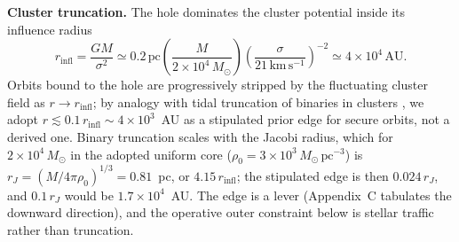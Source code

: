 \documentclass[11pt]{article}
\newcommand{\msun}{\ensuremath{M_\odot}}
\begin{document}
\textbf{Cluster truncation.} The hole dominates the cluster potential inside its influence radius
\begin{equation}
r_{\mathrm{infl}} = \frac{GM}{\sigma^{2}}
\simeq 0.2\,\mathrm{pc}
\left(\frac{M}{2\times10^{4}\,\msun}\right)
\left(\frac{\sigma}{21\,\mathrm{km\,s^{-1}}}\right)^{-2}
\simeq 4\times10^{4}\,\mathrm{AU}.
\end{equation}
Orbits bound to the hole are progressively stripped by the fluctuating cluster field as $r \to r_{\mathrm{infl}}$; by analogy with tidal truncation of binaries in clusters \citep{BinneyTremaine2008,HeggieHut2003}, we adopt $r \lesssim 0.1\,r_{\mathrm{infl}} \sim 4\times10^{3}$~AU as a stipulated prior edge for secure orbits, not a derived one. Binary truncation scales with the Jacobi radius, which for $2\times10^{4}\,\msun$ in the adopted uniform core ($\rho_{0} = 3\times10^{3}\,\msun\,\mathrm{pc^{-3}}$) is $r_{J} = (M/4\pi\rho_{0})^{1/3} = 0.81$~pc, or $4.15\,r_{\mathrm{infl}}$; the stipulated edge is then $0.024\,r_{J}$, and $0.1\,r_{J}$ would be $1.7\times10^{4}$~AU. The edge is a lever (Appendix~C tabulates the downward direction), and the operative outer constraint below is stellar traffic rather than truncation.
\end{document}
